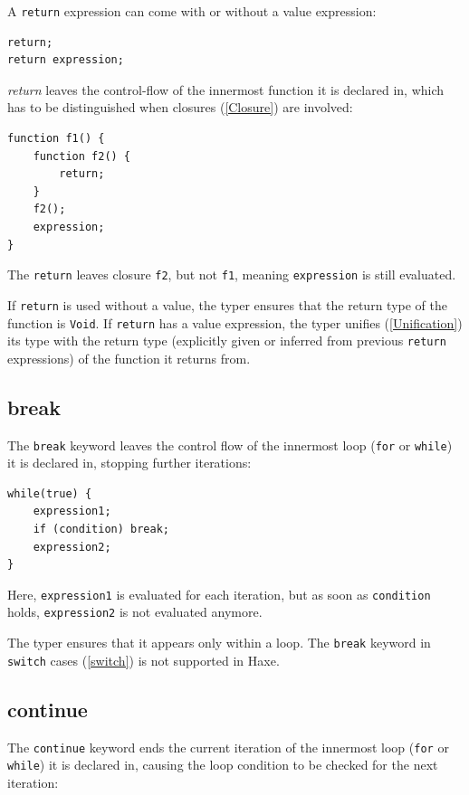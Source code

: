 \documentclass{article}
\newcommand{\type}[1]{\texttt{#1}}
\newcommand{\expr}[1]{\texttt{#1}}
\newcommand{\tref}[2]{#1 (\ref{#2})}
\begin{document}
A \expr{return} expression can come with or without a value expression:

\begin{lstlisting}
return;
return expression;
\end{lstlisting}

\emph{return} leaves the control-flow of the innermost function it is declared in, which has to be distinguished when \tref{closures}{Closure} are involved:

\begin{lstlisting}
function f1() {
	function f2() {
		return;
	}
	f2();
	expression;
}
\end{lstlisting}

The \expr{return} leaves closure \expr{f2}, but not \expr{f1}, meaning \expr{expression} is still evaluated.

If \expr{return} is used without a value, the typer ensures that the return type of the function is \type{Void}. If \expr{return} has a value expression, the typer \tref{unifies}{Unification} its type with the return type (explicitly given or inferred from previous \expr{return} expressions) of the function it returns from.


\subsection{break}
\label{break}

The \expr{break} keyword leaves the control flow of the innermost loop (\expr{for} or \expr{while}) it is declared in, stopping further iterations:

\begin{lstlisting}
while(true) {
	expression1;
	if (condition) break;
	expression2;
}
\end{lstlisting}

Here, \expr{expression1} is evaluated for each iteration, but as soon as \expr{condition} holds, \expr{expression2} is not evaluated anymore.

The typer ensures that it appears only within a loop. The \expr{break} keyword in \tref{\expr{switch} cases}{switch} is not supported in Haxe.


\subsection{continue}
\label{continue}
The \expr{continue} keyword ends the current iteration of the innermost loop (\expr{for} or \expr{while}) it is declared in, causing the loop condition to be checked for the next iteration:
\end{document}
